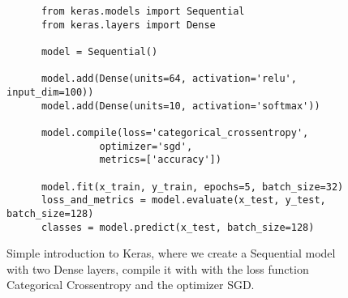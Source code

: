 \begin{figure}
  
\begin{code}
  \begin{verbatim}
      from keras.models import Sequential
      from keras.layers import Dense
  
      model = Sequential()
  
      model.add(Dense(units=64, activation='relu', input_dim=100))
      model.add(Dense(units=10, activation='softmax'))
  
      model.compile(loss='categorical_crossentropy',
                optimizer='sgd',
                metrics=['accuracy'])
      
      model.fit(x_train, y_train, epochs=5, batch_size=32)
      loss_and_metrics = model.evaluate(x_test, y_test, batch_size=128)
      classes = model.predict(x_test, batch_size=128)
  \end{verbatim}

  \caption{Simple introduction to Keras, where we create a Sequential model with two Dense layers, compile it with with the loss function Categorical Crossentropy and the optimizer SGD.}
  \label{code:keras-guide}
\end{code}
\end{figure}